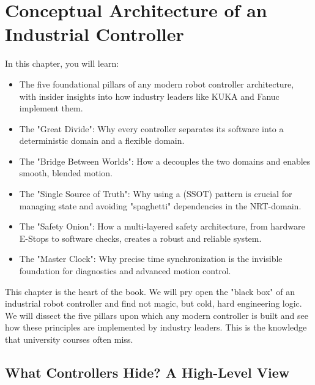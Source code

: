 
\chapter{Conceptual Architecture of an Industrial Controller}
\label{chap:conceptual_architecture}

\begin{navigationbox}{In this chapter, you will learn:}
    \begin{itemize}
        \item The five foundational pillars of any modern robot controller architecture, with insider insights into how industry leaders like KUKA and Fanuc implement them.
        \item The "Great Divide": Why every controller separates its software into a deterministic  domain and a flexible  domain.
        \item The "Bridge Between Worlds": How a  decouples the two domains and enables smooth, blended motion.
        \item The "Single Source of Truth": Why using a  (SSOT) pattern is crucial for managing state and avoiding "spaghetti" dependencies in the NRT-domain.
        \item The "Safety Onion": How a multi-layered safety architecture, from hardware E-Stops to software checks, creates a robust and reliable system.
        \item The "Master Clock": Why precise time synchronization is the invisible foundation for diagnostics and advanced motion control.
    \end{itemize}
\end{navigationbox}


This chapter is the heart of the book. We will pry open the "black box" of an industrial robot controller and find not magic, but cold, hard engineering logic. We will dissect the five pillars upon which any modern controller is built and see how these principles are implemented by industry leaders. This is the knowledge that university courses often miss.

\section{What Controllers Hide? A High-Level View}
\label{sec:what_controllers_hide}

